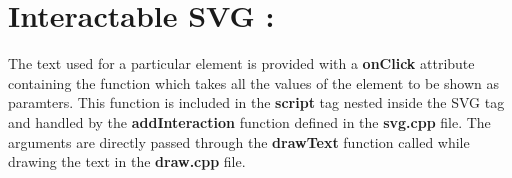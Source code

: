 \documentclass[]{article}
\begin{document}
\section{\LARGE Interactable SVG :}
\Large 
The text used for a particular element is provided with a \textbf{onClick} attribute containing the function which takes all the values of the element to be shown as paramters. This function is included in the \textbf{script} tag nested inside the SVG tag and handled by the \textbf{addInteraction} function defined in the \textbf{svg.cpp} file. The arguments are directly passed through the \textbf{drawText} function called while drawing the text in the \textbf{draw.cpp} file. 
\end{document}
